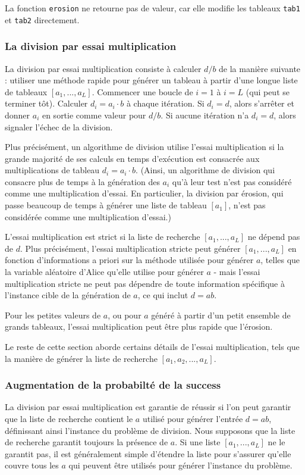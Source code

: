 La fonction \verb|erosion| ne retourne pas de valeur, car elle modifie les tableaux \verb|tab1| et \verb|tab2| directement.

\subsubsection{La division par essai multiplication}
La division par essai multiplication consiste à calculer $d/b$ de la manière suivante : utiliser une méthode rapide pour générer un tableau à partir d'une longue liste de tableaux $[a_1, ..., a_L]$. Commencer une boucle de $i = 1$ à $i = L$ (qui peut se terminer tôt). Calculer $d_i = a_i \cdot b$ à chaque itération. Si $d_i = d$, alors s'arrêter et donner $a_i$ en sortie comme valeur pour $d/b$. Si aucune itération n'a $d_i = d$, alors signaler l'échec de la division.

Plus précisément, un algorithme de division utilise l'essai multiplication si la grande majorité de ses calculs en temps d'exécution est consacrée aux multiplications de tableau $d_i = a_i \cdot b$. (Ainsi, un algorithme de division qui consacre plus de temps à la génération des $a_i$ qu'à leur test n'est pas considéré comme une multiplication d'essai. En particulier, la division par érosion, qui passe beaucoup de temps à générer une liste de tableau $[a_1]$, n'est pas considérée comme une multiplication d'essai.)

L'essai multiplication est strict si la liste de recherche $[a_1, ..., a_L]$ ne dépend pas de $d$. Plus précisément, l'essai multiplication stricte peut générer $[a_1, ..., a_L]$ en fonction d'informations a priori sur la méthode utilisée pour générer $a$, telles que la variable aléatoire d'Alice qu'elle utilise pour générer $a$ - mais l'essai multiplication stricte ne peut pas dépendre de toute information spécifique à l'instance cible de la génération de $a$, ce qui inclut $d = ab$.

Pour les petites valeurs de $a$, ou pour $a$ généré à partir d'un petit ensemble de grands tableaux, l'essai multiplication peut être plus rapide que l'érosion.

Le reste de cette section aborde certains détails de l'essai multiplication, tels que la manière de générer la liste de recherche $[a_1, a_2, ..., a_L]$.
\subsubsection{Augmentation de la probabilté de la success}
La division par essai multiplication est garantie de réussir si l'on peut garantir que la liste de recherche contient le $a$ utilisé pour générer l'entrée $d=ab$, 
définissant ainsi l'instance du problème de division. 
Nous supposons que la liste de recherche garantit toujours la présence de $a$. Si une liste $[a_1,...,a_L]$ ne le garantit pas, 
il est généralement simple d'étendre la liste pour s'assurer qu'elle couvre tous les $a$ qui peuvent être utilisés pour générer l'instance du problème.
